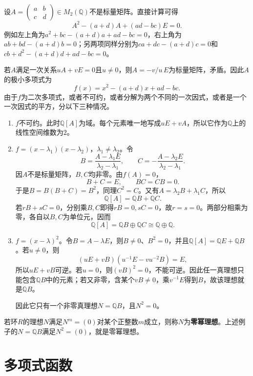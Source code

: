 \begin{example}
设$A=\begin{pmatrix}a&b\\c&d\end{pmatrix}\in M_2(\mathbb Q)$不是标量矩阵。直接计算可得
\[
A^2-(a+d)A+(ad-bc)E=0.
\]
例如左上角为$a^2+bc-(a+d)a+ad-bc=0$，右上角为$ab+bd-(a+d)b=0$；另两项同样分别为$ca+dc-(a+d)c=0$和$cb+d^2-(a+d)d+ad-bc=0$。

若$A$满足一次关系$uA+vE=0$且$u\ne0$，则$A=-v/u\,E$为标量矩阵，矛盾。因此$A$的极小多项式为
\[
f(x)=x^2-(a+d)x+ad-bc.
\]
由于$f$为二次多项式，或者不可约，或者分解为两个不同的一次因式，或者是一个一次因式的平方，分以下三种情况。
\begin{enumerate}

\item $f$不可约。此时$\mathbb Q[A]$为域。每个元素唯一地写成$uE+vA$，所以它作为$\mathbb Q$上的线性空间维数为$2$。

\item $f=(x-\lambda_1)(x-\lambda_2)$，$\lambda_1\ne\lambda_2$。令
\[
B=\frac{A-\lambda_1E}{\lambda_2-\lambda_1},\qquad
C=-\frac{A-\lambda_2E}{\lambda_2-\lambda_1}.
\]
因$A$不是标量矩阵，$B,C$均非零。由$f(A)=0$，
\[
B+C=E,\qquad BC=CB=0.
\]
于是$B=B(B+C)=B^2$，同理$C^2=C$。又有$A=\lambda_2B+\lambda_1C$，所以
\[
\mathbb Q[A]=\mathbb QB+\mathbb QC.
\]
若$rB+sC=0$，分别乘$B,C$即得$rB=0,sC=0$，故$r=s=0$。两部分相乘为零，各自以$B,C$为单位元，因而
\[
\mathbb Q[A]=\mathbb QB\oplus\mathbb QC\cong\mathbb Q\oplus\mathbb Q.
\]

\item $f=(x-\lambda)^2$。令$B=A-\lambda E$，则$B\ne0$、$B^2=0$，并且$\mathbb Q[A]=\mathbb QE+\mathbb QB$。若$u\ne0$，则
\[
(uE+vB)\left(u^{-1}E-vu^{-2}B\right)=E,
\]
所以$uE+vB$可逆。若$u=0$，则$(vB)^2=0$，不能可逆。因此任一真理想只能包含$\mathbb QB$中的元素；若又非零，含某个$vB\ne0$，乘$v^{-1}E$得到$B$，故该理想就是$\mathbb QB$。

因此它只有一个非零真理想$N=\mathbb QB$，且$N^2=0$。
\end{enumerate}
\end{example}

\begin{definition}\label{p2:concept:c3-nilpotent-ideal}
若环$R$的理想$N$满足$N^m=(0)$对某个正整数$m$成立，则称$N$为\textbf{零幂理想}。上述例子的$N=\mathbb QB$满足$N^2=(0)$，就是零幂理想。
\end{definition}




\section{多项式函数}


